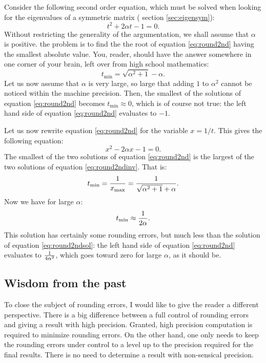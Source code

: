 Consider the following second order equation, which must be solved
when looking for the eigenvalues of a symmetric matrix (\cf
section \ref{sec:eigensym}):
\begin{equation}
\label{eq:round2nd}
  t^2+2\alpha t - 1 =0.
\end{equation}
Without restricting the generality of the argumentation, we shall
assume that $\alpha$ is positive. the problem is to find the the
root of equation \ref{eq:round2nd} having the smallest absolute
value. You, reader, should have the answer somewhere in one corner
of your brain, left over from high school mathematics:
\begin{equation}
\label{eq:round2ndsol}
  t_{\min}=\sqrt{\alpha^2+1} - \alpha.
\end{equation}
Let us now assume that $\alpha$ is very large, so large that
adding $1$ to $\alpha^2$ cannot be noticed within the machine
precision. Then, the smallest of the solutions of equation
\ref{eq:round2nd} becomes $t_{\min}\approx 0$, which is of course
not true: the left hand side of equation  \ref{eq:round2nd}
evaluates to $-1$.

\noindent Let us now rewrite equation \ref{eq:round2nd} for the
variable $x=1/t$. This gives the following equation:
\begin{equation}
\label{eq:round2ndinv}
  x^2-2\alpha x - 1 =0.
\end{equation}
The smallest of the two solutions of equation \ref{eq:round2nd} is
the largest of the two solutions of equation \ref{eq:round2ndinv}.
That is:
\begin{equation}
  t_{\min}={1\over x_{\max}}={1 \over \sqrt{\alpha^2+1} + \alpha}.
\end{equation}
Now we have for large $\alpha$:
\begin{equation}
  t_{\min}\approx {1\over 2\alpha}.
\end{equation}
This solution has certainly some rounding errors, but much less
than the solution of equation \ref{eq:round2ndsol}: the left hand
side of equation \ref{eq:round2nd} evaluates to ${1\over
4\alpha^2}$, which goes toward zero for large $\alpha$, as it
should be.

\subsection{Wisdom from the past}
To close the subject of rounding errors, I would like to give the
reader a different perspective. There is a big difference between
a full control of rounding errors and giving a result with high
precision. Granted, high precision computation is required to
minimize rounding errors. On the other hand, one only needs to
keep the rounding errors under control to a level up to the
precision required for the final results. There is no need to
determine a result with non-sensical precision.

